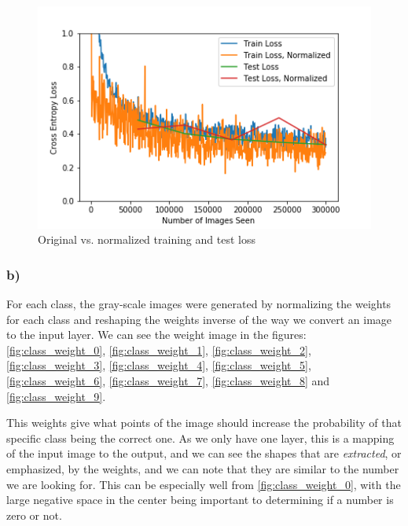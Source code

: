 \begin{figure}[]
    \centering
    \includegraphics[width=1.00\textwidth]{figures/training/original_vs_normalized_training_loss.png}
    \caption{Original vs. normalized training and test loss}
    \label{fig:normalized_training_loss}
\end{figure}

\subsubsection*{b)}
For each class, the gray-scale images were generated by normalizing the weights for each class and reshaping the weights inverse of the way we convert an image to the input layer. We can see the weight image in the figures: \cref{fig:class_weight_0}, \cref{fig:class_weight_1}, \cref{fig:class_weight_2}, \cref{fig:class_weight_3}, \cref{fig:class_weight_4}, \cref{fig:class_weight_5}, \cref{fig:class_weight_6}, \cref{fig:class_weight_7}, \cref{fig:class_weight_8} and \cref{fig:class_weight_9}.  

This weights give what points of the image should increase the probability of that specific class being the correct one. As we only have one layer, this is a mapping of the input image to the output, and we can see the shapes that are \textit{extracted}, or emphasized, by the weights, and we can note that they are similar to the number we are looking for. This can be especially well from \cref{fig:class_weight_0}, with the large negative space in the center being important to determining if a number is zero or not. 

